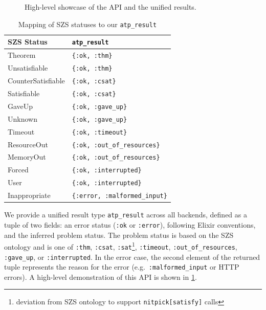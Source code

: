 \documentclass[]{ceurart}
\begin{document}
\begin{figure}[t]
\centering
{}
\caption{High-level showcase of the API and the unified results.}
\label{fig:unified-api}
\end{figure}

\begin{table}[t]
    \centering
    \caption{Mapping of SZS statuses to our \texttt{atp\_result}}
    \label{tab:szs-mapping}
    \begin{tabular}{l l}
        \toprule
        SZS Status & \texttt{atp\_result} \\
        \midrule        
        Theorem & \texttt{\{:ok, :thm\}} \\
        Unsatisfiable & \texttt{\{:ok, :thm\}} \\
        CounterSatisfiable & \texttt{\{:ok, :csat\}} \\
        Satisfiable & \texttt{\{:ok, :csat\}} \\
        GaveUp & \texttt{\{:ok, :gave\_up\}} \\
        Unknown & \texttt{\{:ok, :gave\_up\}} \\
        Timeout & \texttt{\{:ok, :timeout\}} \\
        ResourceOut & \texttt{\{:ok, :out\_of\_resources\}} \\
        MemoryOut & \texttt{\{:ok, :out\_of\_resources\}} \\
        Forced & \texttt{\{:ok, :interrupted\}} \\
        User & \texttt{\{:ok, :interrupted\}} \\
        Inappropriate & \texttt{\{:error, :malformed\_input\}} \\
        \bottomrule
    \end{tabular}
\end{table}

We provide a unified result type \texttt{atp\_result} across all backends, defined as a tuple of two fields: an error status (\texttt{:ok} or \texttt{:error}), following Elixir conventions, and the inferred problem status. The problem status is based on the SZS ontology and is one of \texttt{:thm}, \texttt{:csat}, \texttt{:sat}\footnote{deviation from SZS ontology to support \texttt{nitpick[satisfy]} calls}, \texttt{:timeout}, \texttt{:out\_of\_resources}, \texttt{:gave\_up}, or \texttt{:interrupted}. In the error case, the second element of the returned tuple represents the reason for the error (e.g.\ \texttt{:malformed\_input} or HTTP errors). A high-level demonstration of this API is shown in \cref{fig:unified-api}.
\end{document}
